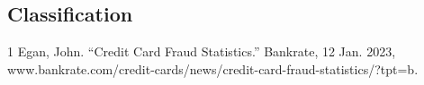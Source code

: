 \documentclass[12pt, letterpaper]{article}
\begin{document}
    \subsection{Classification}


\begin{thebibliography} {1}
    Egan, John. “Credit Card Fraud Statistics.” Bankrate, 12 Jan. 2023, www.bankrate.com/credit-cards/news/credit-card-fraud-statistics/?tpt=b.

    
\end{thebibliography}
    
\end{document}
